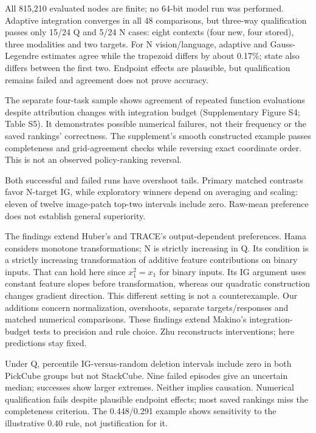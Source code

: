 \documentclass[12pt,letterpaper]{article}
\makeatletter
\renewcommand\section{\@startsection{section}{1}{\z@}{10pt}{4pt}{\normalfont\normalsize\bfseries}}
\makeatother
\begin{document}
All 815,210 evaluated nodes are finite; no 64-bit model run was performed. Adaptive integration converges in all 48 comparisons, but three-way qualification passes only 15/24 Q and 5/24 N cases: eight contexts (four new, four stored), three modalities and two targets. For N vision/language, adaptive and Gauss-Legendre estimates agree while the trapezoid differs by about 0.17\%; state also differs between the first two. Endpoint effects are plausible, but qualification remains failed and agreement does not prove accuracy.

The separate four-task sample shows agreement of repeated function evaluations despite attribution changes with integration budget (Supplementary Figure S4; Table S5). It demonstrates possible numerical failures, not their frequency or the saved rankings' correctness. The supplement's smooth constructed example passes completeness and grid-agreement checks while reversing exact coordinate order. This is not an observed policy-ranking reversal.

\section{Discussion}
Both successful and failed runs have overshoot tails. Primary matched contrasts favor N-target IG, while exploratory winners depend on averaging and scaling: eleven of twelve image-patch top-two intervals include zero. Raw-mean preference does not establish general superiority.

The findings extend Huber's and TRACE's output-dependent preferences. Hama considers monotone transformations\citep{hama2023deletion}; N is strictly increasing in Q. Its condition is a strictly increasing transformation of additive feature contributions on binary inputs. That can hold here since $x_1^2=x_1$ for binary inputs. Its IG argument uses constant feature slopes before transformation, whereas our quadratic construction changes gradient direction. This different setting is not a counterexample. Our additions concern normalization, overshoots, separate targets/responses and matched numerical comparisons.
These findings extend Makino's integration-budget tests to precision and rule choice. Zhu reconstructs interventions; here predictions stay fixed.

Under Q, percentile IG-versus-random deletion intervals include zero in both PickCube groups but not StackCube. Nine failed episodes give an uncertain median; successes show larger extremes. Neither implies causation. Numerical qualification fails despite plausible endpoint effects; most saved rankings miss the completeness criterion. The 0.448/0.291 example shows sensitivity to the illustrative 0.40 rule, not justification for it.
\end{document}
